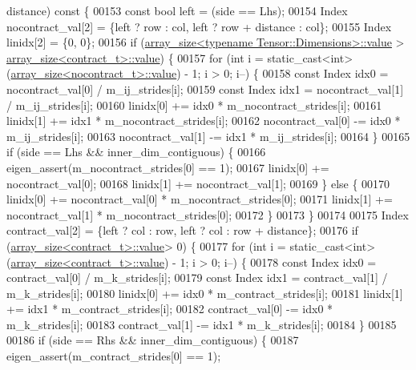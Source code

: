 \begin{DoxyCode}
      distance)\textcolor{keyword}{ const }\{
00153     \textcolor{keyword}{const} \textcolor{keywordtype}{bool} left = (side == Lhs);
00154     Index nocontract\_val[2] = \{left ? row : col, left ? row + distance : col\};
00155     Index linidx[2] = \{0, 0\};
00156     \textcolor{keywordflow}{if} (\hyperlink{struct_eigen_1_1internal_1_1array__size}{array\_size<typename Tensor::Dimensions>::value} > 
      \hyperlink{struct_eigen_1_1internal_1_1array__size}{array\_size<contract\_t>::value}) \{
00157       \textcolor{keywordflow}{for} (\textcolor{keywordtype}{int} i = static\_cast<int>(\hyperlink{struct_eigen_1_1internal_1_1array__size}{array\_size<nocontract\_t>::value}) - 1; i 
      > 0; i--) \{
00158         \textcolor{keyword}{const} Index idx0 = nocontract\_val[0] / m\_ij\_strides[i];
00159         \textcolor{keyword}{const} Index idx1 = nocontract\_val[1] / m\_ij\_strides[i];
00160         linidx[0] += idx0 * m\_nocontract\_strides[i];
00161         linidx[1] += idx1 * m\_nocontract\_strides[i];
00162         nocontract\_val[0] -= idx0 * m\_ij\_strides[i];
00163         nocontract\_val[1] -= idx1 * m\_ij\_strides[i];
00164       \}
00165       \textcolor{keywordflow}{if} (side == Lhs && inner\_dim\_contiguous) \{
00166         eigen\_assert(m\_nocontract\_strides[0] == 1);
00167         linidx[0] += nocontract\_val[0];
00168         linidx[1] += nocontract\_val[1];
00169       \} \textcolor{keywordflow}{else} \{
00170         linidx[0] += nocontract\_val[0] * m\_nocontract\_strides[0];
00171         linidx[1] += nocontract\_val[1] * m\_nocontract\_strides[0];
00172       \}
00173     \}
00174 
00175     Index contract\_val[2] = \{left ? col : row, left ? col : row + distance\};
00176     \textcolor{keywordflow}{if} (\hyperlink{struct_eigen_1_1internal_1_1array__size}{array\_size<contract\_t>::value}> 0) \{
00177       \textcolor{keywordflow}{for} (\textcolor{keywordtype}{int} i = static\_cast<int>(\hyperlink{struct_eigen_1_1internal_1_1array__size}{array\_size<contract\_t>::value}) - 1; i > 0;
       i--) \{
00178         \textcolor{keyword}{const} Index idx0 = contract\_val[0] / m\_k\_strides[i];
00179         \textcolor{keyword}{const} Index idx1 = contract\_val[1] / m\_k\_strides[i];
00180         linidx[0] += idx0 * m\_contract\_strides[i];
00181         linidx[1] += idx1 * m\_contract\_strides[i];
00182         contract\_val[0] -= idx0 * m\_k\_strides[i];
00183         contract\_val[1] -= idx1 * m\_k\_strides[i];
00184       \}
00185 
00186       \textcolor{keywordflow}{if} (side == Rhs && inner\_dim\_contiguous) \{
00187         eigen\_assert(m\_contract\_strides[0] == 1);

\end{DoxyCode}
